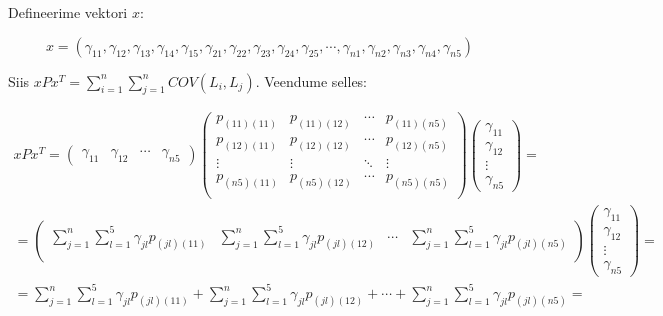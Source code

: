 \documentclass[a4paper]{article}
\newenvironment{tightcenter}{%
  \setlength\topsep{0pt}
  \setlength\parskip{0pt}
  \begin{center}
}{%
  \end{center}
}
\begin{document}
Defineerime  vektori $x$:

\begin{tightcenter}
\begin{equation*}
x = (\gamma_{11},\gamma_{12},\gamma_{13} ,\gamma_{14},\gamma_{15},\gamma_{21},\gamma_{22},\gamma_{23},\gamma_{24},\gamma_{25}, \cdots ,\gamma_{n1},\gamma_{n2},\gamma_{n3},\gamma_{n4},\gamma_{n5})
\end{equation*}
\end{tightcenter}


Siis $xPx^T = \sum \limits_{i=1}^n \sum \limits_{j=1}^n COV(L_i,L_j)$. Veendume selles:
\begin{tightcenter}
\begin{equation*}
\begin{gathered}
xPx^T =
\begin{pmatrix}
\gamma_{11} & \gamma_{12} & \cdots & \gamma_{n5} 
\end{pmatrix}
\begin{pmatrix}
p_{(11)(11)}&p_{(11)(12)}&\cdots&p_{(11)(n5)} \\
p_{(12)(11)}&p_{(12)(12)}&\cdots&p_{(12)(n5)} \\
\vdots&\vdots&\ddots&\vdots \\
p_{(n5)(11)}&p_{(n5)(12)}&\cdots&p_{(n5)(n5)} \\
\end{pmatrix} 
\begin{pmatrix}
\gamma_{11} \\
\gamma_{12} \\
\vdots \\
\gamma_{n5}
\end{pmatrix}
= \\
= 
\begin{pmatrix}
\sum \limits_{j=1}^n \sum \limits_{l=1}^5 \gamma_{jl}p_{(jl)(11)}& \sum \limits_{j=1}^n \sum \limits_{l=1}^5 \gamma_{jl}p_{(jl)(12)} & \cdots &  \sum \limits_{j=1}^n \sum \limits_{l=1}^5 \gamma_{jl}p_{(jl)(n5)} \\
\end{pmatrix}
\begin{pmatrix}
\gamma_{11} \\
\gamma_{12} \\
\vdots \\
\gamma_{n5}
\end{pmatrix}
=\\
=
\sum \limits_{j=1}^n \sum \limits_{l=1}^5 \gamma_{jl}p_{(jl)(11)} + \sum \limits_{j=1}^n \sum \limits_{l=1}^5 \gamma_{jl}p_{(jl)(12)} + \cdots +  \sum \limits_{j=1}^n \sum \limits_{l=1}^5 \gamma_{jl}p_{(jl)(n5)}=\\

\end{gathered}
\end{equation*}
\end{tightcenter}
\end{document}
